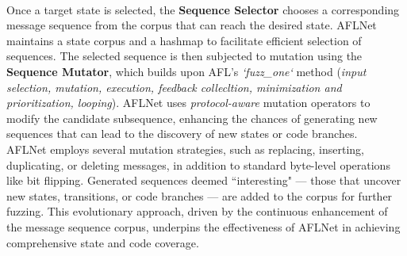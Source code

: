\\Once a target state is selected, the \textbf{Sequence Selector} chooses a corresponding message sequence from the corpus that can reach the desired state. AFLNet maintains a state corpus and a hashmap to facilitate efficient selection of sequences. The selected sequence is then subjected to mutation using the \textbf{Sequence Mutator}, which builds upon AFL's \textit{`fuzz\_one`} method (\textit{input selection, mutation, execution, feedback collecltion, minimization and prioritization, looping}). AFLNet uses \textit{protocol-aware} mutation operators to modify the candidate subsequence, enhancing the chances of generating new sequences that can lead to the discovery of new states or code branches.
\\AFLNet employs several mutation strategies, such as replacing, inserting, duplicating, or deleting messages, in addition to standard byte-level operations like bit flipping. Generated sequences deemed ``interesting" — those that uncover new states, transitions, or code branches — are added to the corpus for further fuzzing. This evolutionary approach, driven by the continuous enhancement of the message sequence corpus, underpins the effectiveness of AFLNet in achieving comprehensive state and code coverage.

